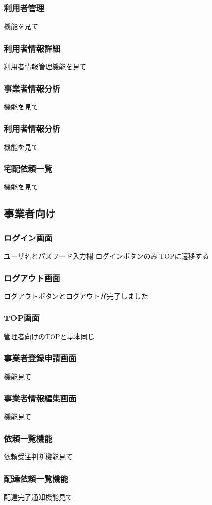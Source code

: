 \documentclass[a4paper, titlepage]{jsarticle}
\begin{document}
\subsubsection{利用者管理}
機能を見て
\subsubsection{利用者情報詳細}
利用者情報管理機能を見て
\subsubsection{事業者情報分析}
機能を見て
\subsubsection{利用者情報分析}
機能を見て
\subsubsection{宅配依頼一覧}
機能を見て

\subsection{事業者向け}
\subsubsection{ログイン画面}
ユーザ名とパスワード入力欄
ログインボタンのみ
TOPに遷移する
\subsubsection{ログアウト画面}
ログアウトボタンとログアウトが完了しました
\subsubsection{TOP画面}
管理者向けのTOPと基本同じ
\subsubsection{事業者登録申請画面}
機能見て
\subsubsection{事業者情報編集画面}
機能見て
\subsubsection{依頼一覧機能}
依頼受注判断機能見て
\subsubsection{配達依頼一覧機能}
配達完了通知機能見て
\end{document}
